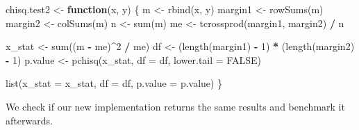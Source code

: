 \documentclass[
]{krantz}
\makeatletter
\newenvironment{Shaded}{\begin{snugshade}}{\end{snugshade}}
\newcommand{\ControlFlowTok}[1]{\textcolor[rgb]{0.13,0.29,0.53}{\textbf{#1}}}
\newcommand{\DataTypeTok}[1]{\textcolor[rgb]{0.13,0.29,0.53}{#1}}
\newcommand{\DecValTok}[1]{\textcolor[rgb]{0.00,0.00,0.81}{#1}}
\newcommand{\KeywordTok}[1]{\textcolor[rgb]{0.13,0.29,0.53}{\textbf{#1}}}
\newcommand{\NormalTok}[1]{#1}
\newcommand{\OperatorTok}[1]{\textcolor[rgb]{0.81,0.36,0.00}{\textbf{#1}}}
\newcommand{\OtherTok}[1]{\textcolor[rgb]{0.56,0.35,0.01}{#1}}
\newcommand{\StringTok}[1]{\textcolor[rgb]{0.31,0.60,0.02}{#1}}
\newenvironment{kframe}{%
\medskip{}
\setlength{\fboxsep}{.8em}
 \def\at@end@of@kframe{}%
 \ifinner\ifhmode%
  \def\at@end@of@kframe{\end{minipage}}%
  \begin{minipage}{\columnwidth}%
 \fi\fi%
 \def\FrameCommand##1{\hskip\@totalleftmargin \hskip-\fboxsep
 \colorbox{shadecolor}{##1}\hskip-\fboxsep
     \hskip-\linewidth \hskip-\@totalleftmargin \hskip\columnwidth}%
 \MakeFramed {\advance\hsize-\width
   \@totalleftmargin\z@ \linewidth\hsize
   \@setminipage}}%
 {\par\unskip\endMakeFramed%
 \at@end@of@kframe}
\renewenvironment{Shaded}{\begin{kframe}}{\end{kframe}}
\renewcommand{\KeywordTok} [1]{\textcolor[rgb]{0.00,0.44,0.13}{{#1}}}
\renewcommand{\DataTypeTok}[1]{\textcolor[rgb]{0.56,0.13,0.00}{{#1}}}
\renewcommand{\DecValTok}  [1]{\textcolor[rgb]{0.25,0.63,0.44}{{#1}}}
\renewcommand{\StringTok}  [1]{\textcolor[rgb]{0.25,0.44,0.63}{{#1}}}
\renewcommand{\OtherTok}   [1]{\textcolor[rgb]{0.00,0.44,0.13}{{#1}}}
\renewcommand{\NormalTok}  [1]{{#1}}
\makeatother
\begin{document}
\begin{Shaded}
\begin{Highlighting}[]
\NormalTok{chisq.test2 <-}\StringTok{ }\ControlFlowTok{function}\NormalTok{(x, y) \{}
\NormalTok{  m <-}\StringTok{ }\KeywordTok{rbind}\NormalTok{(x, y)}
\NormalTok{  margin1 <-}\StringTok{ }\KeywordTok{rowSums}\NormalTok{(m)}
\NormalTok{  margin2 <-}\StringTok{ }\KeywordTok{colSums}\NormalTok{(m)}
\NormalTok{  n <-}\StringTok{ }\KeywordTok{sum}\NormalTok{(m)}
\NormalTok{  me <-}\StringTok{ }\KeywordTok{tcrossprod}\NormalTok{(margin1, margin2) }\OperatorTok{/}\StringTok{ }\NormalTok{n}

\NormalTok{  x_stat <-}\StringTok{ }\KeywordTok{sum}\NormalTok{((m }\OperatorTok{-}\StringTok{ }\NormalTok{me)}\OperatorTok{^}\DecValTok{2} \OperatorTok{/}\StringTok{ }\NormalTok{me)}
\NormalTok{  df <-}\StringTok{ }\NormalTok{(}\KeywordTok{length}\NormalTok{(margin1) }\OperatorTok{-}\StringTok{ }\DecValTok{1}\NormalTok{) }\OperatorTok{*}\StringTok{ }\NormalTok{(}\KeywordTok{length}\NormalTok{(margin2) }\OperatorTok{-}\StringTok{ }\DecValTok{1}\NormalTok{)}
\NormalTok{  p.value <-}\StringTok{ }\KeywordTok{pchisq}\NormalTok{(x_stat, }\DataTypeTok{df =}\NormalTok{ df, }\DataTypeTok{lower.tail =} \OtherTok{FALSE}\NormalTok{)}

  \KeywordTok{list}\NormalTok{(}\DataTypeTok{x_stat =}\NormalTok{ x_stat, }\DataTypeTok{df =}\NormalTok{ df, }\DataTypeTok{p.value =}\NormalTok{ p.value)}
\NormalTok{\}}
\end{Highlighting}
\end{Shaded}

We check if our new implementation returns the same results and benchmark it afterwards.
\end{document}
